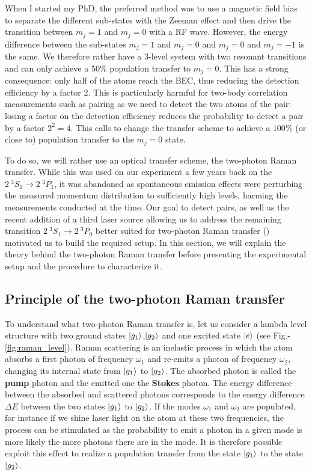 When I started my PhD, the preferred method was to use a magnetic field bias to separate the different sub-states with the Zeeman effect and then drive the transition between $m_j=1$ and $m_j=0$ with a RF wave. However, the energy difference between the sub-states $m_j=1$ and $m_j=0$ and $m_j=0$ and $m_j=-1$ is the same. We therefore rather have a 3-level system with two resonant transitions and can only achieve a $50\%$ population transfer to $m_j=0$. This has a strong consequence: only half of the atoms reach the BEC, thus reducing the detection efficiency by a factor 2. This is particularly harmful for two-body correlation measurements such as \kmk pairing as we need to detect the two atoms of the pair: losing a factor on the detection efficiency reduces the probability to detect a \kmk pair by a factor $2^2=4$. This calls to change the transfer scheme to achieve a $100\%$ (or close to) population transfer to the $m_j=0$ state.

To do so, we will rather use an optical transfer scheme, the two-photon Raman transfer. While this was used on our experiment a few years back on the $2 \ ^3 S_1 \rightarrow 2 \ ^3 P_1$, it was abandoned as spontaneous emission effects were perturbing the measured momentum distribution to sufficiently high levels, harming the measurements conducted at the time. Our goal to detect \kmk pairs, as well as the recent addition of a third laser source allowing us to address the remaining transition $2 \ ^3 S_1 \rightarrow 2 \ ^3 P_0$ better suited for two-photon Raman transfer () motivated us to build the required setup. In this section, we will explain the theory behind the two-photon Raman transfer before presenting the experimental setup and the procedure to characterize it.

\subsection{Principle of the two-photon Raman transfer}


To understand what two-photon Raman transfer is, let us consider a lambda level structure with two ground states $\ket{g_1}$,$\ket{g_2}$ and one excited state $\ket{e}$ (see Fig.-\ref{fig:raman_level}). Raman scattering is an inelastic process in which the atom absorbs a first photon of frequency $\omega_1$ and re-emits a photon of frequency $\omega_2$, changing its internal state from $\ket{g_1}$ to $\ket{g_2}$. The absorbed photon is called the \textbf{pump} photon and the emitted one the \textbf{Stokes} photon. The energy difference between the absorbed and scattered photons corresponds to the energy difference $\Delta E$ between the two states $\ket{g_1}$ to $\ket{g_2}$. If the modes $\omega_1$ and $\omega_2$ are populated, for instance if we shine laser light on the atom at these two frequencies, the process can be stimulated as the probability to emit a photon in a given mode is more likely the more photons there are in the mode. It is therefore possible exploit this effect to realize a population transfer from the state $\ket{g_1}$ to the state $\ket{g_2}$.

